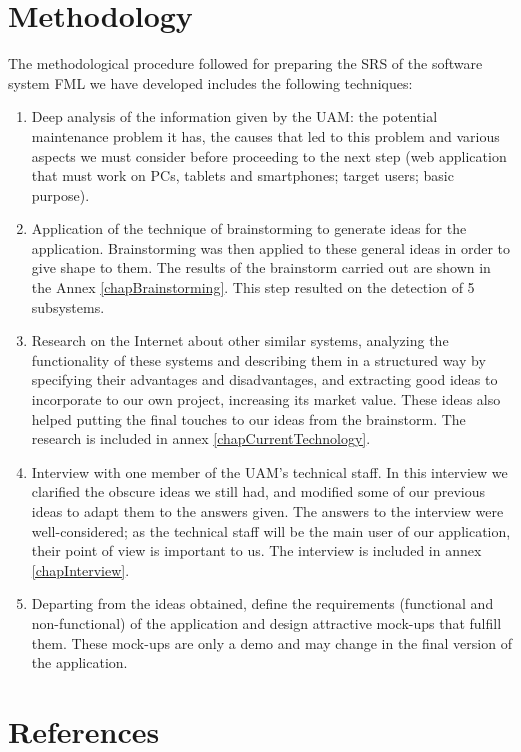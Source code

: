 \documentclass{report}
\begin{document}
\section{Methodology}

The methodological procedure followed for preparing the SRS of the software system FML we have developed includes the following techniques:
\begin{enumerate}
\item Deep analysis of the information given by the UAM: the potential maintenance problem it has, the causes that led to this problem and various aspects we must consider before proceeding to the next step (web application that must work on PCs, tablets and smartphones; target users; basic purpose).
\item Application of the technique of brainstorming to generate ideas for the application. Brainstorming was then applied to these general ideas in order to give shape to them. The results of the brainstorm carried out are shown in the Annex \ref{chapBrainstorming}. This step resulted on the detection of 5 subsystems.
\item Research on the Internet about other similar systems, analyzing the functionality of these systems and describing them in a structured way by specifying their advantages and disadvantages, and extracting good ideas to incorporate to our own project, increasing its market value. These ideas also helped putting the final touches to our ideas from the brainstorm. The research is included in annex \ref{chapCurrentTechnology}.
\item Interview with one member of the UAM's technical staff. In this interview we clarified the obscure ideas we still had, and modified some of our previous ideas to adapt them to the answers given. The answers to the interview were well-considered; as the technical staff will be the main user of our application, their point of view is important to us. The interview is included in annex \ref{chapInterview}.
\item Departing from the ideas obtained, define the requirements (functional and non-functional) of the application and design attractive mock-ups that fulfill them. These mock-ups are only a demo and may change in the final version of the application.
\end{enumerate}

\section{References}
\label{references}

\end{document}
